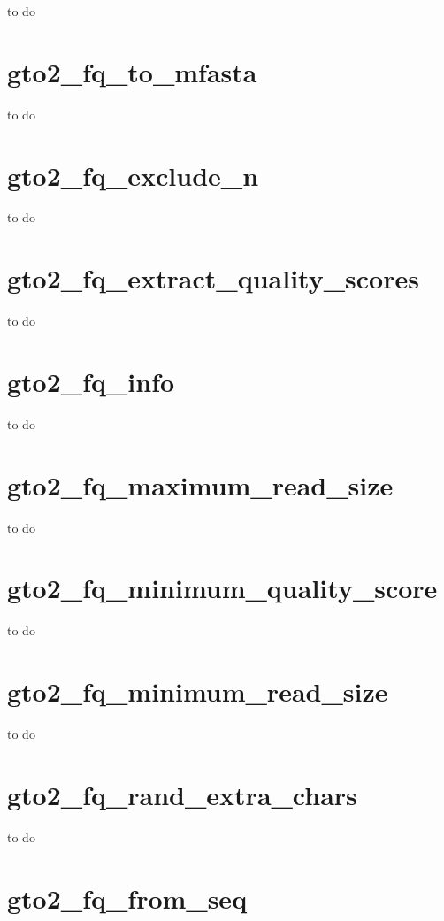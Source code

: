 \documentclass[11pt,]{krantz}
\begin{document}
to do

\section{gto2\_fq\_to\_mfasta}\label{gto2_fq_to_mfasta}

to do

\section{gto2\_fq\_exclude\_n}\label{gto2_fq_exclude_n}

to do

\section{gto2\_fq\_extract\_quality\_scores}\label{gto2_fq_extract_quality_scores}

to do

\section{gto2\_fq\_info}\label{gto2_fq_info}

to do

\section{gto2\_fq\_maximum\_read\_size}\label{gto2_fq_maximum_read_size}

to do

\section{gto2\_fq\_minimum\_quality\_score}\label{gto2_fq_minimum_quality_score}

to do

\section{gto2\_fq\_minimum\_read\_size}\label{gto2_fq_minimum_read_size}

to do

\section{gto2\_fq\_rand\_extra\_chars}\label{gto2_fq_rand_extra_chars}

to do

\section{gto2\_fq\_from\_seq}\label{gto2_fq_from_seq}
\end{document}
